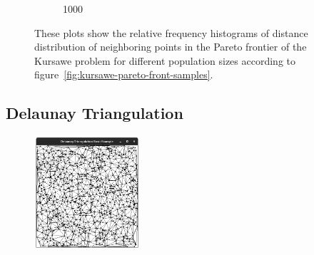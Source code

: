 \documentclass{stdlocal}
\begin{document}
\begin{figure}[t]
\begin{subfigure}[b]{0.24\textwidth}
        \caption{1000}
      \end{subfigure}
      \caption[]{%
        These plots show the relative frequency histograms of distance distribution of neighboring points in the Pareto frontier of the Kursawe problem for different population sizes according to figure~\ref{fig:kursawe-pareto-front-samples}.
      }
      \label{fig:kursawe-histogram-samples}
    \end{figure}
  \subsection{Delaunay Triangulation} %
  \label{sub:delaunay_triangulation}
    \begin{figure}
      \center
      \includegraphics[width=0.35\textwidth]{../../images/delaunay_2d.png}
    \end{figure}
\end{document}
